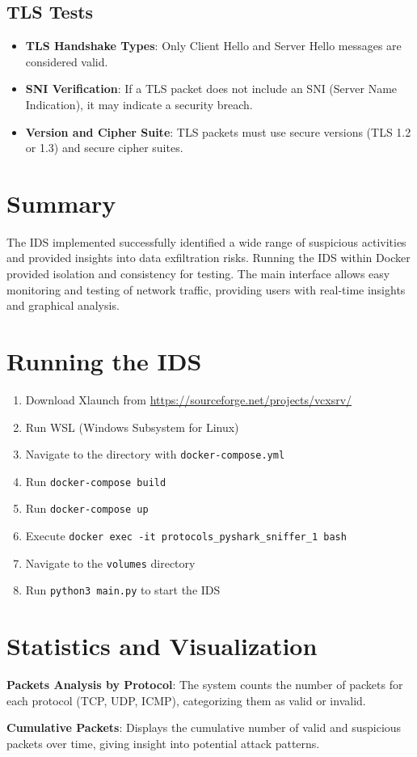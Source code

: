 \documentclass{article}
\begin{document}
\subsection{TLS Tests}
\begin{itemize}
    \item \textbf{TLS Handshake Types}: Only Client Hello and Server Hello messages are considered valid.
    \item \textbf{SNI Verification}: If a TLS packet does not include an SNI (Server Name Indication), it may indicate a security breach.
    \item \textbf{Version and Cipher Suite}: TLS packets must use secure versions (TLS 1.2 or 1.3) and secure cipher suites.
\end{itemize}

\section{Summary}
The IDS implemented successfully identified a wide range of suspicious activities and provided insights into data exfiltration risks. Running the IDS within Docker provided isolation and consistency for testing. The main interface allows easy monitoring and testing of network traffic, providing users with real-time insights and graphical analysis.

\section{Running the IDS}
\begin{enumerate}
    \item Download Xlaunch from \url{https://sourceforge.net/projects/vcxsrv/}
    \item Run WSL (Windows Subsystem for Linux)
    \item Navigate to the directory with \texttt{docker-compose.yml}
    \item Run \texttt{docker-compose build}
    \item Run \texttt{docker-compose up}
    \item Execute \texttt{docker exec -it protocols\_pyshark\_sniffer\_1 bash}
    \item Navigate to the \texttt{volumes} directory
    \item Run \texttt{python3 main.py} to start the IDS
\end{enumerate}

\section{Statistics and Visualization}
\textbf{Packets Analysis by Protocol}: The system counts the number of packets for each protocol (TCP, UDP, ICMP), categorizing them as valid or invalid.

\textbf{Cumulative Packets}: Displays the cumulative number of valid and suspicious packets over time, giving insight into potential attack patterns.
\end{document}
